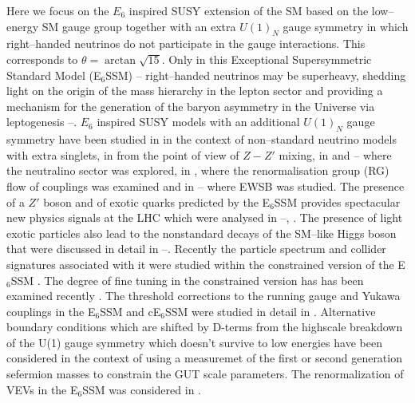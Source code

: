\documentclass[12pt,a4paper]{article}
\begin{document}
Here we focus on the $E_6$ inspired SUSY extension of the SM based on
the low--energy SM gauge group together with an extra $U(1)_{N}$ gauge
symmetry in which right--handed neutrinos do not participate in the
gauge interactions. This corresponds to $\theta=\arctan\sqrt{15}$.
Only in this Exceptional Supersymmetric Standard Model (E$_6$SSM)
\cite{King:2005jy}--\cite{King:2005my} right--handed neutrinos may be
superheavy, shedding light on the origin of the mass hierarchy in the
lepton sector and providing a mechanism for the generation of the
baryon asymmetry in the Universe via leptogenesis
\cite{Hambye:2000bn}--\cite{King:2008qb}. $E_6$ inspired SUSY models
with an additional $U(1)_{N}$ gauge symmetry have been studied in
\cite{Ma:1995xk} in the context of non--standard neutrino models with
extra singlets, in \cite{Suematsu:1997au} from the point of view of
$Z-Z'$ mixing, in \cite{Keith:1997zb} and
\cite{Suematsu:1997au}--\cite{Keith:1996fv} where the neutralino
sector was explored, in \cite{Keith:1997zb}, \cite{King:2007uj} where
the renormalisation group (RG) flow of couplings was examined and in
\cite{Suematsu:1994qm}--\cite{Daikoku:2000ep} where EWSB was
studied. The presence of a $Z'$ boson and of exotic quarks predicted
by the E$_6$SSM provides spectacular new physics signals at the LHC
which were analysed in \cite{King:2005jy}--\cite{Accomando:2006ga},
\cite{Howl:2007zi}. The presence of light exotic particles also lead
to the nonstandard decays of the SM--like Higgs boson that were
discussed in detail in \cite{Nevzorov:2013tta}--\cite{Hall:2010ix}.
Recently the particle spectrum and collider signatures associated with
it were studied within the constrained version of the E$_6$SSM
\cite{cE6SSM}. The degree of fine tuning in the constrained version has has been examined recently \cite{Athron:2013ipa}. The threshold corrections to the running gauge and
Yukawa couplings in the E$_6$SSM and cE$_6$SSM were studied in detail
in \cite{Athron:2012pw}. Alternative boundary conditions which are shifted by D-terms from the highscale breakdown of the U(1) gauge symmetry which doesn't survive to low energies have been considered in the context of using a measuremet of the first or second generation sefermion masses to constrain the GUT scale parameters\cite{Miller:2012vn}. The renormalization of VEVs in the E$_6$SSM
was considered in \cite{Sperling:2013eva}.
\end{document}
